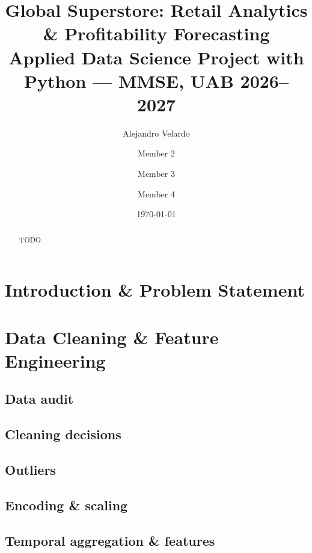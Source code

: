\documentclass[11pt,a4paper]{article}
\title{Global Superstore: Retail Analytics \& Profitability Forecasting\\
\large Applied Data Science Project with Python --- MMSE, UAB 2026--2027}
\author{Alejandro Velardo \and Member 2 \and Member 3 \and Member 4}
\date{\today}
\begin{document}
\maketitle
\begin{abstract}
TODO
\end{abstract}
\tableofcontents
\newpage

\section{Introduction \& Problem Statement}

\section{Data Cleaning \& Feature Engineering}
\subsection{Data audit}           %
\subsection{Cleaning decisions}   %
\subsection{Outliers}             %
\subsection{Encoding \& scaling}  %
\subsection{Temporal aggregation \& features} %
\end{document}
